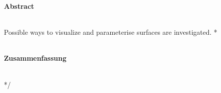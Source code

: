 
\newenvironment{abstractpage}
  {\cleardoublepage\vspace*{\fill}\thispagestyle{empty}}
  {\vfill\cleardoublepage}
\newenvironment{superabstract}[1]
  {\selectlanguage{#1}%
   \begin{center}\bfseries\abstractname\end{center}}{\newline}

\newpage\thispagestyle{empty}\text{ }
 \begin{center}\textbf{Abstract}\end{center}~\\
 Possible ways to visualize and parameterise surfaces are investigated.
\/*
\\~\\
 \begin{center}\textbf{Zusammenfassung}\end{center}~\\

\newpage\thispagestyle{empty}\text{ }
\newpage
*/

